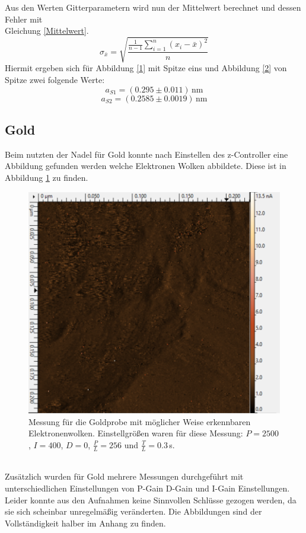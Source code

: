 \FloatBarrier
Aus den Werten Gitterparametern wird nun der Mittelwert  berechnet und dessen Fehler mit \\Gleichung \ref{Mittelwert}. 
\begin{equation}
	\sigma_{\bar{x}}=\sqrt{\frac{\frac{1}{n-1}\sum_{i=1}^{n}\left(x_i-\bar{x}\right)^2}{n}}
	\label{Mittelwert}
\end{equation}
Hiermit ergeben sich für Abbildung \ref{1} mit Spitze eins und Abbildung \ref{2} von Spitze zwei folgende Werte:
\begin{equation*}
	a_{S1}=(0.295\pm 0.011)\,\text{nm}
\end{equation*}
\begin{equation*}
	a_{S2}=(0.2585\pm0.0019)\,\text{nm}
\end{equation*}
\subsection{Gold}
Beim nutzten der Nadel für Gold konnte nach Einstellen des z-Controller eine Abbildung gefunden werden welche Elektronen Wolken abbildete. Diese ist in Abbildung \ref{Gold} zu finden.
\begin{figure}[ht]
	\includegraphics[scale=0.5]{Bild/Gold}
	\centering
	\caption[Messung von Gold]{Messung für die Goldprobe mit möglicher Weise erkennbaren Elektronenwolken. Einstellgrößen waren für diese Messung: $P=2500$, $I=400$, $D=0$, $\frac{P}{L}=256$ und $\frac{T}{L}=0.3\,$s.}
	\label{Gold}
\end{figure}\\
Zusätzlich wurden für Gold mehrere Messungen durchgeführt mit unterschiedlichen Einstellungen von P-Gain D-Gain und I-Gain Einstellungen.
Leider konnte aus den Aufnahmen keine Sinnvollen Schlüsse gezogen werden, da sie sich scheinbar unregelmäßig veränderten. Die Abbildungen sind der Vollständigkeit halber im Anhang zu finden.\par
\newpage

